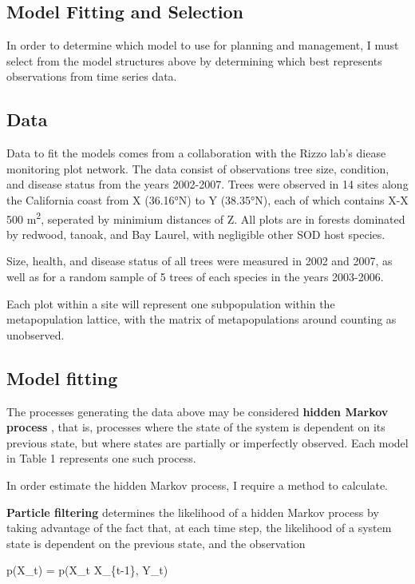 \documentclass[english,nohyper,nofonts,nobib,nols,twoside]{tufte-handout}
\renewcommand\citep\cite
\begin{document}
\subsection{Model Fitting and Selection}

In order to determine which model to use for planning and management, I
must select from the model structures above by determining which best
represents observations from time series data.

\subsection{Data}

Data to fit the models comes from a collaboration with the Rizzo lab's
diease monitoring plot network. The data consist of observations tree
size, condition, and disease status from the years 2002-2007. Trees were
observed in 14 sites along the California coast from X (36.16°N) to Y
(38.35°N), each of which contains X-X 500 m\textsuperscript{2},
seperated by minimium distances of Z. All plots are in forests dominated
by redwood, tanoak, and Bay Laurel, with negligible other SOD host
species.

Size, health, and disease status of all trees were measured in 2002 and
2007, as well as for a random sample of 5 trees of each species in the
years 2003-2006.

Each plot within a site will represent one subpopulation within the
metapopulation lattice, with the matrix of metapopulations around
counting as unobserved.

\subsection{Model fitting}

The processes generating the data above may be considered \textbf{hidden
Markov process} \citep{Gimenez2012}, that is, processes where the state
of the system is dependent on its previous state, but where states are
partially or imperfectly observed. Each model in Table 1 represents one
such process.

In order estimate the hidden Markov process, I require a method to
calculate.

\textbf{Particle filtering} determines the likelihood of a hidden Markov
process by taking advantage of the fact that, at each time step, the
likelihood of a system state is dependent on the previous state, and the
observation

p(X\_t) = p(X\_t \textbar{} X\_\{t-1\}, Y\_t)
\end{document}
